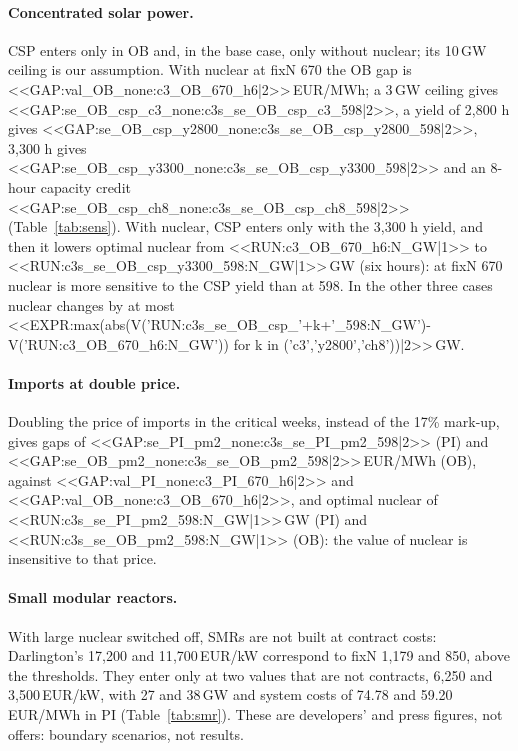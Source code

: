 \paragraph{Concentrated solar power.} CSP enters only in OB and, in the base case, only without nuclear; its 10\,GW ceiling is our assumption. With nuclear at fixN 670 the OB gap is <<GAP:val_OB_none:c3_OB_670_h6|2>>\,EUR/MWh; a 3\,GW ceiling gives <<GAP:se_OB_csp_c3_none:c3s_se_OB_csp_c3_598|2>>, a yield of 2{,}800 h gives <<GAP:se_OB_csp_y2800_none:c3s_se_OB_csp_y2800_598|2>>, 3{,}300 h gives <<GAP:se_OB_csp_y3300_none:c3s_se_OB_csp_y3300_598|2>> and an 8-hour capacity credit <<GAP:se_OB_csp_ch8_none:c3s_se_OB_csp_ch8_598|2>> (Table~\ref{tab:sens}). With nuclear, CSP enters only with the 3{,}300 h yield, and then it lowers optimal nuclear from <<RUN:c3_OB_670_h6:N_GW|1>> to <<RUN:c3s_se_OB_csp_y3300_598:N_GW|1>>\,GW (six hours): at fixN 670 nuclear is more sensitive to the CSP yield than at 598. In the other three cases nuclear changes by at most <<EXPR:max(abs(V('RUN:c3s_se_OB_csp_'+k+'_598:N_GW')-V('RUN:c3_OB_670_h6:N_GW')) for k in ('c3','y2800','ch8'))|2>>\,GW.

\paragraph{Imports at double price.} Doubling the price of imports in the critical weeks, instead of the 17\% mark-up, gives gaps of <<GAP:se_PI_pm2_none:c3s_se_PI_pm2_598|2>> (PI) and <<GAP:se_OB_pm2_none:c3s_se_OB_pm2_598|2>>\,EUR/MWh (OB), against <<GAP:val_PI_none:c3_PI_670_h6|2>> and <<GAP:val_OB_none:c3_OB_670_h6|2>>, and optimal nuclear of <<RUN:c3s_se_PI_pm2_598:N_GW|1>>\,GW (PI) and <<RUN:c3s_se_OB_pm2_598:N_GW|1>> (OB): the value of nuclear is insensitive to that price.

\begin{table}[htbp]
\centering
\caption{Sensitivities, six hours, four years, imports with a capacity credit (earlier rule); cost in EUR/MWh.}\label{tab:sens}

\end{table}

\paragraph{Small modular reactors.} With large nuclear switched off, SMRs are not built at contract costs: Darlington's 17{,}200 and 11{,}700\,EUR/kW correspond to fixN 1{,}179 and 850, above the thresholds. They enter only at two values that are not contracts, 6{,}250 and 3{,}500\,EUR/kW, with 27 and 38\,GW and system costs of 74.78 and 59.20\,EUR/MWh in PI (Table~\ref{tab:smr}). These are developers' and press figures, not offers: boundary scenarios, not results.

